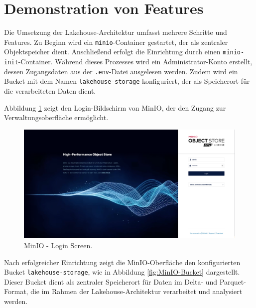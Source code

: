 \newpage

\section{Demonstration von Features}

Die Umsetzung der Lakehouse-Architektur umfasst mehrere Schritte und Features. Zu Beginn wird ein \lstinline|minio|-Container gestartet, der als zentraler Objektspeicher dient. Anschließend erfolgt die Einrichtung durch einen \lstinline|minio-init|-Container. Während dieses Prozesses wird ein Administrator-Konto erstellt, dessen Zugangsdaten aus der \lstinline|.env|-Datei ausgelesen werden. Zudem wird ein Bucket mit dem Namen \lstinline|lakehouse-storage| konfiguriert, der als Speicherort für die verarbeiteten Daten dient.

Abbildung \ref{fig:MinIO-Login} zeigt den Login-Bildschirm von MinIO, der den Zugang zur Verwaltungsoberfläche ermöglicht. 

\begin{figure}[H]
    \centering
    \includegraphics[width=1\linewidth]{graphics/minio-login.png}
    \caption[MinIO - Login Screen]{MinIO - Login Screen.}
    \label{fig:MinIO-Login}
\end{figure}

Nach erfolgreicher Einrichtung zeigt die MinIO-Oberfläche den konfigurierten Bucket \lstinline|lakehouse-storage|, wie in Abbildung \ref{fig:MinIO-Bucket} dargestellt. Dieser Bucket dient als zentraler Speicherort für Daten im Delta- und Parquet-Format, die im Rahmen der Lakehouse-Architektur verarbeitet und analysiert werden.

